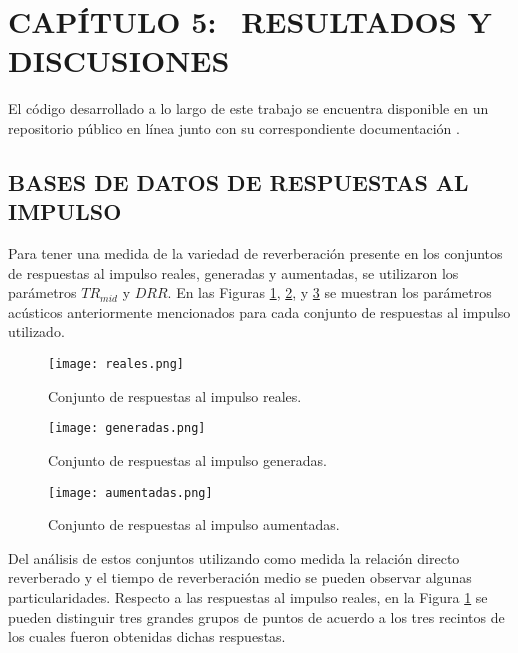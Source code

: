 \section[Resultados y Discusiones]{CAPÍTULO 5:$\ \ \ \ $RESULTADOS Y DISCUSIONES} 
El código desarrollado a lo largo de este trabajo se encuentra disponible en un repositorio público en línea junto con su correspondiente documentación \cite{repo}.

\subsection[Bases de datos de respuestas al impulso]{BASES DE DATOS DE RESPUESTAS AL IMPULSO}

Para tener una medida de la variedad de reverberación presente en los conjuntos de respuestas al impulso reales, generadas y aumentadas, se utilizaron los parámetros $TR_{mid}$ y $DRR$. En las Figuras \ref{fig:cloud_reales}, \ref{fig:cloud_generadas}, y \ref{fig:cloud_aumentadas} se muestran los parámetros acústicos anteriormente mencionados para cada conjunto de respuestas al impulso utilizado.  

\begin{figure}[H]
	\centering{}
	\texttt{[image: reales.png]}
	\caption{Conjunto de respuestas al impulso reales.}
	\label{fig:cloud_reales}
\end{figure}

\begin{figure}[H]
	\centering{}
	\texttt{[image: generadas.png]}
	\caption{Conjunto de respuestas al impulso generadas.}
	\label{fig:cloud_generadas}
\end{figure}

\begin{figure}[H]
	\centering{}
	\texttt{[image: aumentadas.png]}
	\caption{Conjunto de respuestas al impulso aumentadas.}
	\label{fig:cloud_aumentadas}
\end{figure}

Del análisis de estos conjuntos utilizando como medida la relación directo reverberado  y el tiempo de reverberación medio se pueden observar algunas particularidades. Respecto a las respuestas al impulso reales, en la Figura \ref{fig:cloud_reales} se pueden distinguir tres grandes grupos de puntos de acuerdo a los tres recintos de los cuales fueron obtenidas dichas respuestas. 




